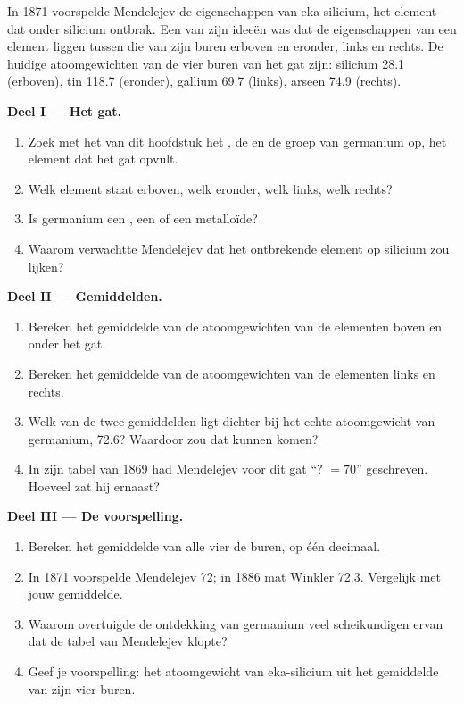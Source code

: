\begin{problem}
\label{pb:g9:periodic-table-first-look:1}
In 1871 voorspelde Mendelejev de eigenschappen van eka-silicium, het
element dat onder silicium ontbrak. Een van zijn ideeën was dat de
eigenschappen van een element liggen tussen die van zijn buren erboven en
eronder, links en rechts. De huidige atoomgewichten van de vier buren van
het gat zijn: silicium 28.1 (erboven), tin 118.7 (eronder), gallium 69.7
(links), arseen 74.9 (rechts).

\medskip
\noindent\textbf{Deel I --- Het gat.}
\begin{enumerate}
  \item Zoek met het  van dit hoofdstuk het
        , de  en de groep van germanium op, het element
        dat het gat opvult.
  \item Welk element staat erboven, welk eronder, welk links, welk
        rechts?
  \item Is germanium een , een  of een metalloïde?
  \item Waarom verwachtte Mendelejev dat het ontbrekende element op
        silicium zou lijken?
\end{enumerate}

\medskip
\noindent\textbf{Deel II --- Gemiddelden.}
\begin{enumerate}[resume]
  \item Bereken het gemiddelde van de atoomgewichten van de elementen
        boven en onder het gat.
  \item Bereken het gemiddelde van de atoomgewichten van de elementen
        links en rechts.
  \item Welk van de twee gemiddelden ligt dichter bij het echte
        atoomgewicht van germanium, 72.6? Waardoor zou dat kunnen komen?
  \item In zijn tabel van 1869 had Mendelejev voor dit gat ``? $= 70$''
        geschreven. Hoeveel zat hij ernaast?
\end{enumerate}

\medskip
\noindent\textbf{Deel III --- De voorspelling.}
\begin{enumerate}[resume]
  \item Bereken het gemiddelde van alle vier de buren, op één decimaal.
  \item In 1871 voorspelde Mendelejev 72; in 1886 mat Winkler 72.3.
        Vergelijk met jouw gemiddelde.
  \item Waarom overtuigde de ontdekking van germanium veel scheikundigen
        ervan dat de tabel van Mendelejev klopte?
  \item Geef je voorspelling: het atoomgewicht van eka-silicium uit het
        gemiddelde van zijn vier buren.
\end{enumerate}
\end{problem}
